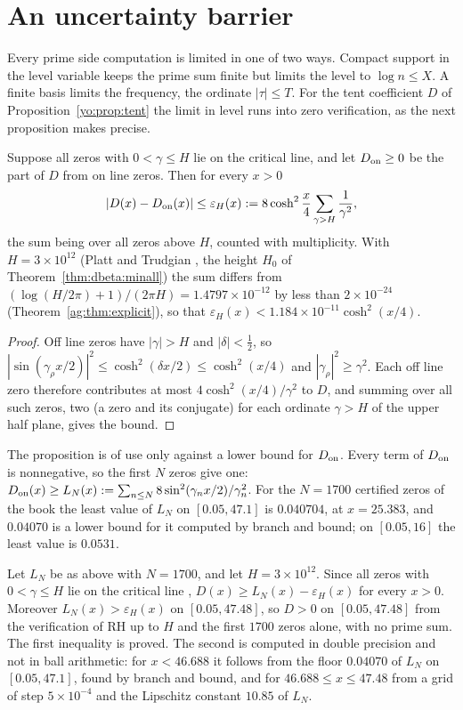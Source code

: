 \section{An uncertainty barrier}\label{yo:sec:barrier}

Every prime side computation is limited in one of two ways. Compact support in the level variable keeps the prime sum finite but limits the level to $\log n\le X$. A finite basis limits the frequency, the ordinate $|\tau|\le T$. For the tent coefficient $D$ of Proposition~\ref{yo:prop:tent} the limit in level runs into zero verification, as the next proposition makes precise.

\begin{proposition}\label{yo:prop:barrier}
Suppose all zeros with $0<\gamma\le H$ lie on the critical line, and let $D_{\rm on}\ge0$ be the part of $D$ from on line zeros. Then for every $x>0$
\[
|D(x)-D_{\rm on}(x)|\le\varepsilon_H(x):=8\cosh^2\frac x4\sum_{\gamma>H}\frac1{\gamma^2},
\]
the sum being over all zeros above $H$, counted with multiplicity. With $H=3\times10^{12}$ (Platt and Trudgian \cite{PT21}, the height $H_0$ of Theorem~\ref{thm:dbeta:minall}) the sum differs from $(\log(H/2\pi)+1)/(2\pi H)=1.4797\times10^{-12}$ by less than $2\times10^{-24}$ (Theorem~\ref{ag:thm:explicit}), so that $\varepsilon_H(x)<1.184\times10^{-11}\cosh^2(x/4)$.
\end{proposition}

\begin{proof}
Off line zeros have $|\gamma|>H$ and $|\delta|<\frac12$, so $|\sin(\gamma_\rho x/2)|^2\le\cosh^2(\delta x/2)\le\cosh^2(x/4)$ and $|\gamma_\rho|^2\ge\gamma^2$. Each off line zero therefore contributes at most $4\cosh^2(x/4)/\gamma^2$ to $D$, and summing over all such zeros, two (a zero and its conjugate) for each ordinate $\gamma>H$ of the upper half plane, gives the bound.
\end{proof}

The proposition is of use only against a lower bound for $D_{\rm on}$. Every term of $D_{\rm on}$ is nonnegative, so the first $N$ zeros give one: $D_{\rm on}(x)\ge L_N(x):=\sum_{n\le N}8\sin^2(\gamma_nx/2)/\gamma_n^2$. For the $N=1700$ certified zeros of the book the least value of $L_N$ on $[0.05,47.1]$ is $0.040704$, at $x=25.383$, and $0.04070$ is a lower bound for it computed by branch and bound; on $[0.05,16]$ the least value is $0.0531$.

\begin{proposition}\label{yo:prop:Dpos}
Let $L_N$ be as above with $N=1700$, and let $H=3\times10^{12}$. Since all zeros with $0<\gamma\le H$ lie on the critical line \cite{PT21}, $D(x)\ge L_N(x)-\varepsilon_H(x)$ for every $x>0$. Moreover $L_N(x)>\varepsilon_H(x)$ on $[0.05,47.48]$, so $D>0$ on $[0.05,47.48]$ from the verification of RH up to $H$ and the first $1700$ zeros alone, with no prime sum. The first inequality is proved. The second is computed in double precision and not in ball arithmetic: for $x<46.688$ it follows from the floor $0.04070$ of $L_N$ on $[0.05,47.1]$, found by branch and bound, and for $46.688\le x\le47.48$ from a grid of step $5\times10^{-4}$ and the Lipschitz constant $10.85$ of $L_N$.
\end{proposition}

